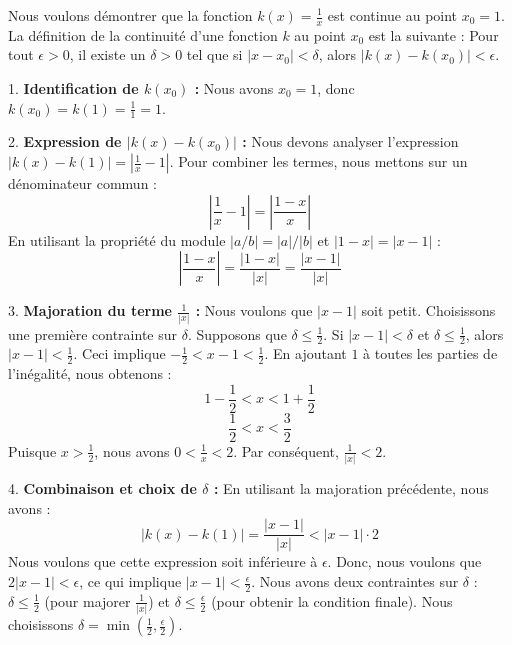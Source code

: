 \documentclass[12pt,a4paper]{report}
\begin{document}
Nous voulons démontrer que la fonction $k(x) = \frac{1}{x}$ est continue au point $x_0 = 1$.
La définition de la continuité d'une fonction $k$ au point $x_0$ est la suivante :
Pour tout $\epsilon > 0$, il existe un $\delta > 0$ tel que si $|x - x_0| < \delta$, alors $|k(x) - k(x_0)| < \epsilon$.

1.  \textbf{Identification de $k(x_0)$ :}
    Nous avons $x_0 = 1$, donc $k(x_0) = k(1) = \frac{1}{1} = 1$.

2.  \textbf{Expression de $|k(x) - k(x_0)|$ :}
    Nous devons analyser l'expression $|k(x) - k(1)| = \left|\frac{1}{x} - 1\right|$.
    Pour combiner les termes, nous mettons sur un dénominateur commun :
    $$ \left|\frac{1}{x} - 1\right| = \left|\frac{1 - x}{x}\right| $$
    En utilisant la propriété du module $|a/b| = |a|/|b|$ et $|1-x| = |x-1|$ :
    $$ \left|\frac{1 - x}{x}\right| = \frac{|1 - x|}{|x|} = \frac{|x - 1|}{|x|} $$

3.  \textbf{Majoration du terme $\frac{1}{|x|}$ :}
    Nous voulons que $|x - 1|$ soit petit. Choisissons une première contrainte sur $\delta$. Supposons que $\delta \le \frac{1}{2}$.
    Si $|x - 1| < \delta$ et $\delta \le \frac{1}{2}$, alors $|x - 1| < \frac{1}{2}$.
    Ceci implique $-\frac{1}{2} < x - 1 < \frac{1}{2}$.
    En ajoutant $1$ à toutes les parties de l'inégalité, nous obtenons :
    $$ 1 - \frac{1}{2} < x < 1 + \frac{1}{2} $$
    $$ \frac{1}{2} < x < \frac{3}{2} $$
    Puisque $x > \frac{1}{2}$, nous avons $0 < \frac{1}{x} < 2$.
    Par conséquent, $\frac{1}{|x|} < 2$.

4.  \textbf{Combinaison et choix de $\delta$ :}
    En utilisant la majoration précédente, nous avons :
    $$ |k(x) - k(1)| = \frac{|x - 1|}{|x|} < |x - 1| \cdot 2 $$
    Nous voulons que cette expression soit inférieure à $\epsilon$. Donc, nous voulons que $2|x - 1| < \epsilon$, ce qui implique $|x - 1| < \frac{\epsilon}{2}$.
    Nous avons deux contraintes sur $\delta$ : $\delta \le \frac{1}{2}$ (pour majorer $\frac{1}{|x|}$) et $\delta \le \frac{\epsilon}{2}$ (pour obtenir la condition finale).
    Nous choisissons $\delta = \min\left(\frac{1}{2}, \frac{\epsilon}{2}\right)$.
\end{document}

